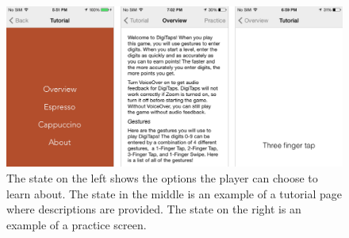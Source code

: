 \begin{figure}[ht!]
  \centering
  \includegraphics[width=1.0\textwidth]{figures/tutorial.png}
  \caption{The state on the left shows the options the player can choose to learn about. The state in the middle is an example of a tutorial page where descriptions are provided. The state on the right is an example of a practice screen.}
  \label{tutorial}
\end{figure}

